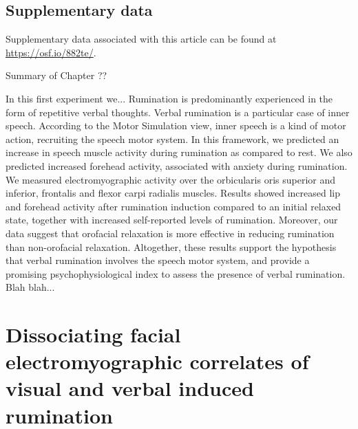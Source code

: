 \documentclass[a4paper,12pt,twoside,openright,oldfontcommands]{memoir}
\newcommand\getcurrentref[1]{
 \ifnumequal{\value{#1}}{0}
  {??}
  {\the\value{#1}}
}
\begin{document}
\hypertarget{suppCH3}{%
\section{Supplementary data}\label{suppCH3}}

Supplementary data associated with this article can be found at \url{https://osf.io/882te/}.

\newpage

\begin{vplace}[1]

\begin{summary}{Summary of Chapter\getcurrentref{chapter}}

In this first experiment we... Rumination is predominantly experienced in the form of repetitive verbal thoughts. Verbal rumination is a particular case of inner speech. According to the Motor Simulation view, inner speech is a kind of motor action, recruiting the speech motor system. In this framework, we predicted an increase in speech muscle activity during rumination as compared to rest. We also predicted increased forehead activity, associated with anxiety during rumination. We measured electromyographic activity over the orbicularis oris superior and inferior, frontalis and flexor carpi radialis muscles. Results showed increased lip and forehead activity after rumination induction compared to an initial relaxed state, together with increased self-reported levels of rumination. Moreover, our data suggest that orofacial relaxation is more effective in reducing rumination than non-orofacial relaxation. Altogether, these results support the hypothesis that verbal rumination involves the speech motor system, and provide a promising psychophysiological index to assess the presence of verbal rumination.\\

Blah blah...

\end{summary}

\end{vplace}

\hypertarget{dissociating-facial-electromyographic-correlates-of-visual-and-verbal-induced-rumination}{%
\chapter{Dissociating facial electromyographic correlates of visual and verbal induced rumination}\label{dissociating-facial-electromyographic-correlates-of-visual-and-verbal-induced-rumination}}
\end{document}
